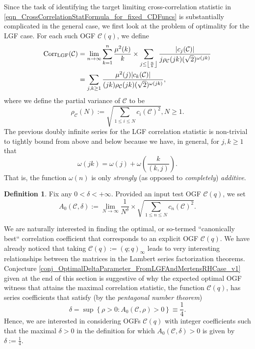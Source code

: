 \documentclass[12pt,reqno,a4letter]{article}
\numberwithin{figure}{section}
\numberwithin{table}{section}
\numberwithin{equation}{section}
\newcommand{\Floor}[2]{\ensuremath{\left\lfloor \frac{#1}{#2} \right\rfloor}}
\theoremstyle{plain}
\numberwithin{theorem}{section}
\theoremstyle{definition}
\newtheorem{definition}[theorem]{Definition}
\begin{document}
Since the task of identifying the target limiting cross-correlation statistic in 
\eqref{eqn_CrossCorrelationStatFormula_for_fixed_CDFuncs} is substantially complicated 
in the general case, we first look at the problem of optimality for the LGF case. 
For each such OGF $\mathcal{C}(q)$, we define 
\begin{align}
\notag 
\operatorname{Corr}_{\operatorname{LGF}}(\mathcal{C}) & = 
     \lim_{n \rightarrow \infty} \sum_{k=1}^{n} \frac{\mu^2(k)}{k} \times 
     \sum_{j \leq \Floor{n}{k}} \frac{|c_j(\mathcal{C})|}{j \rho_{\mathcal{C}}(jk) 
     (\sqrt{2})^{\omega\left(jk\right)}} \\ 
\label{eqn_CorrLGFStat_DoubleSeriesExps_v2} 
     & = \sum_{j,k \geq 1} 
     \frac{\mu^2(j) |c_k(\mathcal{C})|}{(jk) \rho_{\mathcal{C}}(jk) 
     (\sqrt{2})^{\omega(jk)}}, 
\end{align} 
where we define the partial variance of $\mathcal{C}$ to be 
\[
\rho_{\mathcal{C}}(N) := \sqrt{\sum_{1 \leq i \leq N} c_i(\mathcal{C})^2}, N \geq 1. 
\]
The previous doubly infinite series for the LGF correlation statistic is non-trivial 
to tightly bound from above and below because we have, in general, for $j,k \geq 1$ that 
\[
\omega(jk) = \omega(j) + \omega\left(\frac{k}{(k, j)}\right). 
\]
That is, the function $\omega(n)$ is only \emph{strongly} (as opposed to \emph{completely}) \emph{additive}. 

\begin{definition}
\label{def_PairCorrStatsGenOGF_CharsAndParameterSpecs_v2} 
Fix any $0 < \delta < +\infty$. Provided an input test OGF $\mathcal{C}(q)$, we set 
\[
A_0(\mathcal{C}, \delta) := \lim_{N \rightarrow \infty} 
     \frac{1}{N^{\delta}} \times \sqrt{\sum_{1 \leq n \leq N} 
     c_n(\mathcal{C})^2}. 
\]
\end{definition}

We are naturally interested in finding the optimal, or so-termed ``canonically best`` correlation 
coefficient that corresponds to an explicit OGF $\mathcal{C}(q)$. 
We have already noticed that taking $\mathcal{C}(q) := (q; q)_{\infty}$ leads to very interesting 
relationships between the matrices in the Lambert series factorization theorems. 
Conjecture \ref{conj_OptimalDeltaParameter_FromLGFAndMertensRHCase_v1} 
given at the end of this section is suggestive of why the expected optimal OGF witness that 
attains the maximal correlation statistic, the function $\mathcal{C}(q)$, 
has series coefficients that satisfy (by the \emph{pentagonal number theorem}) 
$$\delta = \sup\left\{\rho > 0: A_0(\mathcal{C}, \rho) > 0\right\} \equiv \frac{1}{4}.$$ 
Hence, we are interested in considering OGFs $\mathcal{C}(q)$ with integer coefficients such that 
the maximal $\delta > 0$ in the definition for which $A_0(\mathcal{C},\delta) > 0$ is given by 
$\delta := \frac{1}{4}$. 
\end{document}
